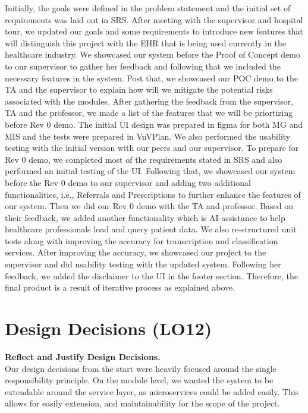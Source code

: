 \documentclass{article}
\begin{document}
Initially, the goals were defined in the problem statement and the initial set of requirements was laid out in SRS. After meeting with the supervisor and hospital tour, we updated our goals and some requirements to introduce new features that will distinguish this project with the EHR that is being used currently in the healthcare industry. We showcased our system before the Proof of Concept demo to our supervisor to gather her feedback and following that we included the necessary features in the system. Post that, we showcased our POC demo to the TA and the supervisor to explain how will we mitigate the potential risks associated with the modules. After gathering the feedback from the supervisor, TA and the professor, we made a list of the features that we will be priortizing before Rev 0 demo. The initial UI design was prepared in figma for both MG and MIS and the tests were prepared in VnVPlan. We also performed the usability testing with the initial version with our peers and our supervisor. To prepare for Rev 0 demo, we completed most of the requirements stated in SRS and also performed an initial testing of the UI. Following that, we showcased our system before the Rev 0 demo to our supervisor and adding two additional functionalities, i.e., Referrals and Prescriptions to further enhance the features of our system. Then we did our Rev 0 demo with the TA and professor. Based on their feedback, we added another functionality which is AI-assistance to help healthcare professionals load and query patient data. We also re-structured unit tests along with improving the accuracy for transcription and classification services. After improving the accuracy, we showcased our project to the supervisor and did usability testing with the updated system. Following her feedback, we added the disclaimer to the UI in the footer section. Therefore, the final product is a result of iterative process as explained above.        

\section{Design Decisions (LO12)}


\textbf{Reflect and Justify Design Decisions.}\\
Our design decisions from the start were heavily focused around the single responsibility principle. On the module level, we wanted the system to be extendable around the service layer, as microservices could be added easily. This allows for easily extension, and maintainability for the scope of the project. \\
\end{document}
